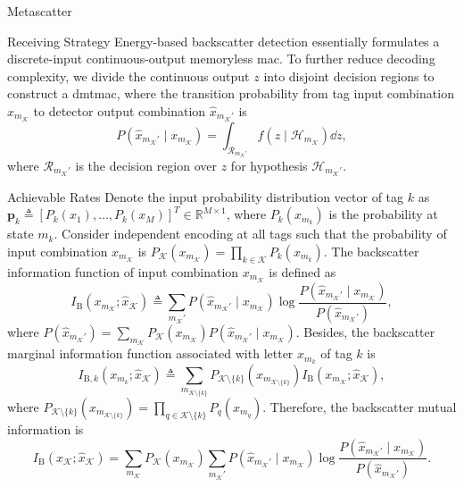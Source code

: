 \documentclass[journal]{IEEEtran}
\begin{document}
\begin{section}{Metascatter}
\begin{subsection}{Receiving Strategy}
		Energy-based backscatter detection essentially formulates a discrete-input continuous-output memoryless \gls{mac}.
		To further reduce decoding complexity, we divide the continuous output $z$ into disjoint decision regions to construct a \gls{dmtmac}, where the transition probability from tag input combination $x_{m_{\mathcal{K}}}$ to detector output combination $\hat{x}_{m_{\mathcal{K}}'}$ is
		\begin{equation}
			P(\hat{x}_{m_{\mathcal{K}}'} \mid x_{m_{\mathcal{K}}}) = \int_{\mathcal{R}_{m_{\mathcal{K}}'}} f(z \mid \mathcal{H}_{m_{\mathcal{K}}}) \dd z,
			\label{eq:dmtmac}
		\end{equation}
		where $\mathcal{R}_{m_{\mathcal{K}}'}$ is the decision region over $z$ for hypothesis $\mathcal{H}_{m_{\mathcal{K}}'}$.
	\end{subsection}

	\begin{subsection}{Achievable Rates}
		Denote the input probability distribution vector of tag $k$ as $\boldsymbol{p}_k \triangleq [P_k(x_1),\ldots,P_k(x_M)]^T \in \mathbb{R}^{M \times 1}$, where $P_k(x_{m_k})$ is the probability at state $m_k$.
		Consider independent encoding at all tags such that the probability of input combination $x_{m_{\mathcal{K}}}$ is $P_{\mathcal{K}}(x_{m_{\mathcal{K}}}) = \prod_{k \in \mathcal{K}} P_k(x_{m_k})$.
		The backscatter information function of input combination $x_{m_{\mathcal{K}}}$ is defined as
		\begin{equation}
			I_{\mathrm{B}}(x_{m_{\mathcal{K}}};\hat{x}_{\mathcal{K}}) \triangleq \sum_{m_{\mathcal{K}}'} P(\hat{x}_{m_{\mathcal{K}}'} \mid x_{m_{\mathcal{K}}}) \log \frac{P(\hat{x}_{m_{\mathcal{K}}'} \mid x_{m_{\mathcal{K}}})}{P(\hat{x}_{m_{\mathcal{K}}'})},
			\label{eq:backscatter_information_function}
		\end{equation}
		where $P(\hat{x}_{m_{\mathcal{K}}'}) = \sum_{m_{\mathcal{K}}} P_{\mathcal{K}}(x_{m_{\mathcal{K}}}) P(\hat{x}_{m_{\mathcal{K}}'} \mid x_{m_{\mathcal{K}}})$.
		Besides, the backscatter marginal information function associated with letter $x_{m_k}$ of tag $k$ is
		\begin{equation}
			I_{\mathrm{B},k}(x_{m_k};\hat{x}_{\mathcal{K}}) \triangleq \sum_{m_{\mathcal{K} \setminus \{k\}}} P_{\mathcal{K} \setminus \{k\}}(x_{m_{\mathcal{K} \setminus \{k\}}}) I_{\mathrm{B}}(x_{m_{\mathcal{K}}};\hat{x}_{\mathcal{K}}),
			\label{eq:backscatter_marginal_information_function}
		\end{equation}
		where $P_{\mathcal{K} \setminus \{k\}}(x_{m_{\mathcal{K} \setminus \{k\}}}) = \prod_{q \in \mathcal{K} \setminus \{k\}} P_{q}(x_{m_{q}})$.
		Therefore, the backscatter mutual information is
		\begin{equation}
			I_{\mathrm{B}}(x_{\mathcal{K}};\hat{x}_{\mathcal{K}}) = \sum_{m_{\mathcal{K}}} P_{\mathcal{K}}(x_{m_{\mathcal{K}}}) \sum_{m_{\mathcal{K}}'} P(\hat{x}_{m_{\mathcal{K}}'} \mid x_{m_{\mathcal{K}}}) \log \frac{P(\hat{x}_{m_{\mathcal{K}}'} \mid x_{m_{\mathcal{K}}})}{P(\hat{x}_{m_{\mathcal{K}}'})}.
			\label{eq:backscatter_mutual_information}
		\end{equation}


\end{subsection}
\end{section}
\end{document}
